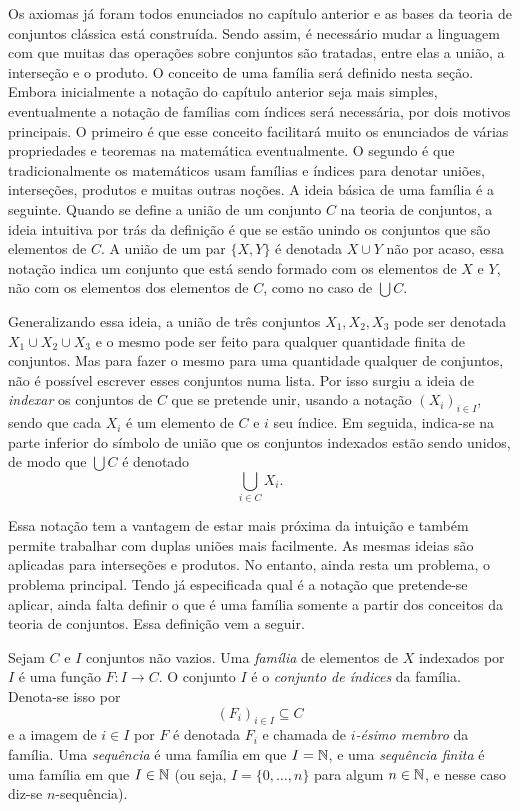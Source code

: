 Os axiomas já foram todos enunciados no capítulo anterior e as bases da teoria de conjuntos clássica está construída. Sendo assim, é necessário mudar a linguagem com que muitas das operações sobre conjuntos são tratadas, entre elas a união, a interseção e o produto. O conceito de uma família será definido nesta seção. Embora inicialmente a notação do capítulo anterior seja mais simples, eventualmente a notação de famílias com índices será necessária, por dois motivos principais. O primeiro é que esse conceito facilitará muito os enunciados de várias propriedades e teoremas na matemática eventualmente. O segundo é que tradicionalmente os matemáticos usam famílias e índices para denotar uniões, interseções, produtos e muitas outras noções. A ideia básica de uma família é a seguinte. Quando se define a união de um conjunto $C$ na teoria de conjuntos, a ideia intuitiva por trás da definição é que se estão unindo os conjuntos que são elementos de $C$. A união de um par $\{X,Y\}$ é denotada $X \cup Y$ não por acaso, essa notação indica um conjunto que está sendo formado com os elementos de $X$ e $Y$, não com os elementos dos elementos de $C$, como no caso de $\bigcup C$. 

Generalizando essa ideia, a união de três conjuntos $X_1,X_2,X_3$ pode ser denotada $X_1 \cup X_2 \cup X_3$ e o mesmo pode ser feito para qualquer quantidade finita de conjuntos. Mas para fazer o mesmo para uma quantidade qualquer de conjuntos, não é possível escrever esses conjuntos numa lista. Por isso surgiu a ideia de \emph{indexar} os conjuntos de $C$ que se pretende unir, usando a notação $(X_i)_{i \in I}$, sendo que cada $X_i$ é um elemento de $C$ e $i$ seu índice. Em seguida, indica-se na parte inferior do símbolo de união que os conjuntos indexados estão sendo unidos, de modo que $\bigcup C$ é denotado
	\begin{equation*}
	\bigcup_{i \in C} X_i.
	\end{equation*}

Essa notação tem a vantagem de estar mais próxima da intuição e também permite trabalhar com duplas uniões mais facilmente. As mesmas ideias são aplicadas para interseções e produtos. No entanto, ainda resta um problema, o problema principal. Tendo  já especificada qual é a notação que pretende-se aplicar, ainda falta definir o que é uma família somente a partir dos conceitos da teoria de conjuntos. Essa definição vem a seguir.

\begin{defi}
	Sejam $C$ e $I$ conjuntos não vazios. Uma \emph{família} de elementos de $X$ indexados por $I$ é uma função $F: I \to C$. O conjunto $I$ é o \emph{conjunto de índices} da família. Denota-se isso por
	\begin{equation*}
	(F_i)_{i \in I} \subseteq C
	\end{equation*}
e a imagem de $i \in I$ por $F$ é denotada $F_i$ e chamada de \emph{$i$-ésimo membro} da família.
\noindent
Uma \emph{sequência} é uma família em que $I=\mathbb{N}$, e uma \emph{sequência finita} é uma família em que $I \in \mathbb{N}$ (ou seja, $I=\{0,\ldots,n\}$ para algum $n \in \mathbb{N}$, e nesse caso diz-se $n$-sequência).
\end{defi}

